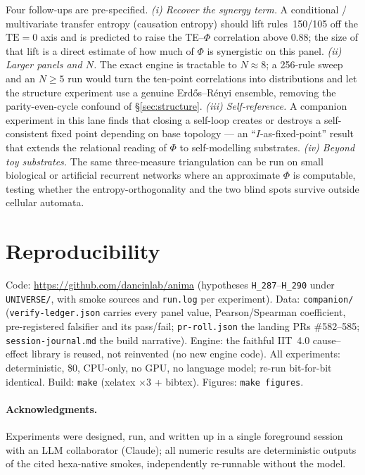\documentclass[11pt,a4paper]{article}
\newcommand{\bigphi}{\ensuremath{\Phi}}
\begin{document}
Four follow-ups are pre-specified. \emph{(i) Recover the synergy term.}
A conditional / multivariate transfer entropy (causation entropy) should
lift rules~150/105 off the \(\mathrm{TE}=0\) axis and is predicted to
raise the TE--\bigphi{} correlation above \(0.88\); the size of that lift
is a direct estimate of how much of \bigphi{} is synergistic on this
panel. \emph{(ii) Larger panels and \(N\).} The exact engine is tractable
to \(N\!\approx\!8\); a 256-rule sweep and an \(N\ge5\) run would turn the
ten-point correlations into distributions and let the structure
experiment use a genuine Erd\H{o}s--R\'enyi ensemble, removing the
parity-even-cycle confound of \S\ref{sec:structure}. \emph{(iii)
Self-reference.} A companion experiment in this lane finds that closing a
self-loop creates or destroys a self-consistent fixed point depending on
base topology --- an ``\(I\)-as-fixed-point'' result that extends the
relational reading of \bigphi{} to self-modelling substrates. \emph{(iv)
Beyond toy substrates.} The same three-measure triangulation can be run on
small biological or artificial recurrent networks where an approximate
\bigphi{} is computable, testing whether the entropy-orthogonality and the
two blind spots survive outside cellular automata.

\section{Reproducibility}
\label{sec:repro}

Code: \url{https://github.com/dancinlab/anima} (hypotheses
\texttt{H\_287}--\texttt{H\_290} under \texttt{UNIVERSE/}, with smoke
sources and \texttt{run.log} per experiment). Data: \texttt{companion/}
(\texttt{verify-ledger.json} carries every panel value, Pearson/Spearman
coefficient, pre-registered falsifier and its pass/fail;
\texttt{pr-roll.json} the landing PRs \#582--585;
\texttt{session-journal.md} the build narrative). Engine: the faithful
IIT~4.0 cause--effect library is reused, not reinvented (no new engine
code). All experiments: deterministic, \$0, CPU-only, no GPU, no language
model; re-run bit-for-bit identical. Build: \texttt{make} (xelatex
\(\times 3\) + bibtex). Figures: \texttt{make figures}.

\paragraph{Acknowledgments.}
Experiments were designed, run, and written up in a single foreground
session with an LLM collaborator (Claude); all numeric results are
deterministic outputs of the cited hexa-native smokes, independently
re-runnable without the model.
\end{document}
